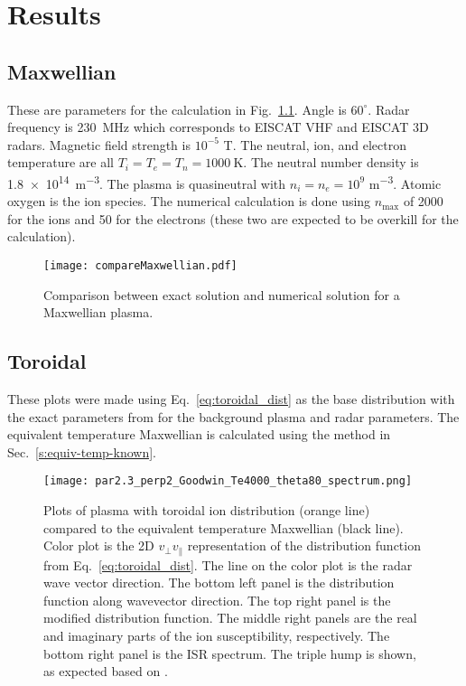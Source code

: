 \chapter{Results}

\section{Maxwellian}

These are parameters for the calculation in Fig.~\ref{f:compareMaxwellian}.
Angle is $60^\circ$. 
Radar frequency is \SI{230}{\mega\hertz} which corresponds to EISCAT VHF and EISCAT 3D radars.  %
Magnetic field strength is $10^{-5}$ \si{\tesla}.
The neutral, ion, and electron temperature are all $T_i=T_e=T_n=\SI{1000}{\kelvin}$.
The neutral number density is \SI{1.8e14}{\meter^{-3}}.
The plasma is quasineutral with $n_i=n_e=10^9$ \si{\meter^{-3}}.
Atomic oxygen is the ion species.
The numerical calculation is done using $n_{\max}$ of 2000 for the ions and 50 for the electrons (these two are expected to be overkill for the calculation).

\begin{figure}[!htb]
	\texttt{[image: compareMaxwellian.pdf]}
	\caption{Comparison between exact solution and numerical solution for a Maxwellian plasma.}
	\label{f:compareMaxwellian}
\end{figure}


\section{Toroidal}

These plots were made using Eq.~\ref{eq:toroidal_dist} as the base distribution with the exact parameters from \cite{goodwin2018} for the background plasma and radar parameters.
The equivalent temperature Maxwellian is calculated using the method in Sec.~\ref{s:equiv-temp-known}.

\begin{figure}[!htb]
	\texttt{[image: par2.3\_perp2\_Goodwin\_Te4000\_theta80\_spectrum.png]}
	\caption{Plots of plasma with toroidal ion distribution (orange line) compared to the equivalent temperature Maxwellian (black line).
	Color plot is the 2D $v_\perp v_\parallel$ representation of the distribution function from Eq.~\ref{eq:toroidal_dist}.
	The line on the color plot is the radar wave vector direction.
	The bottom left panel is the distribution function along wavevector direction.
	The top right panel is the modified distribution function.
	The middle right panels are the real and imaginary parts of the ion susceptibility, respectively.
	The bottom right panel is the ISR spectrum.
	The triple hump is shown, as expected based on \cite{goodwin2018}.}
	\label{f:toroidal}
\end{figure}